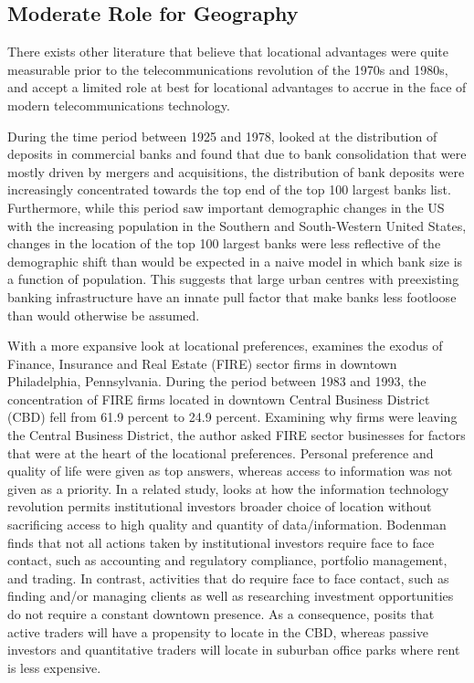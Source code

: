 \subsection{Moderate Role for Geography}
	
There exists other literature that believe that locational advantages were quite measurable prior to the telecommunications revolution of the 1970s and 1980s, and accept a limited role at best for locational advantages to accrue in the face of modern telecommunications technology.
	
During the time period between 1925 and 1978, \cite{rhoades1982size} looked at the distribution of deposits in commercial banks and found that due to bank consolidation that were mostly driven by mergers and acquisitions, the distribution of bank deposits were increasingly concentrated towards the top end of the top 100 largest banks list. Furthermore, while this period saw important demographic changes in the US with the increasing population in the Southern and South-Western United States, changes in the location of the top 100 largest banks were less reflective of the demographic shift than would be expected in a naive model in which bank size is a function of population.  This suggests that large urban centres with preexisting banking infrastructure have an innate pull factor that make banks less footloose than would otherwise be assumed.  
	

With a more expansive look at locational preferences, \cite{bodenmanthe1998} examines the exodus of  Finance, Insurance and Real Estate (FIRE) sector firms in downtown Philadelphia, Pennsylvania.   During the period between 1983 and 1993, the concentration of FIRE firms located in downtown Central Business District (CBD) fell from 61.9 percent to 24.9 percent.  Examining why firms were leaving the Central Business District, the author asked FIRE sector businesses for factors that were at the heart of the locational preferences.  Personal preference and quality of life were given as top answers, whereas access to information was not given as a priority.  In a related study, \cite{bodenmanfirm2000} looks at how the information technology revolution permits institutional investors broader choice of location without sacrificing access to high quality and quantity of data/information.  Bodenman finds that not all actions taken by institutional investors require face to face contact, such as accounting and regulatory compliance, portfolio management, and trading.  In contrast, activities that do require face to face contact, such as finding and/or managing clients as well as researching investment opportunities do not require a constant downtown presence. As a consequence, \cite{bodenmanfirm2000} posits that active traders will have a propensity to locate in the CBD, whereas passive investors and quantitative traders will locate in suburban office parks where rent is less expensive.  
	
